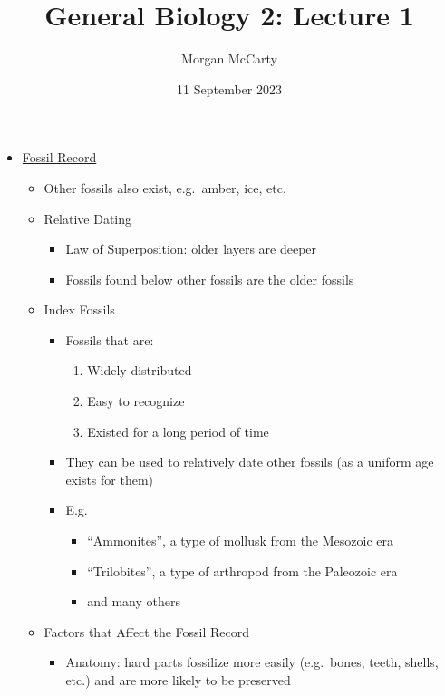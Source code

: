 \documentclass[12pt]{article}
\title{
    General Biology 2: Lecture 1}
\author{Morgan McCarty}
\date{11 September 2023}
\begin{document}
    \maketitle

    \begin{itemize}
        \item \underline{Fossil Record}
        \begin{itemize}
            \item Other fossils also exist, e.g.\ amber, ice, etc.
            \item Relative Dating
            \begin{itemize}
                \item Law of Superposition: older layers are deeper
                \item Fossils found below other fossils are the older fossils
            \end{itemize}
            \item Index Fossils
            \begin{itemize}
                \item Fossils that are:
                \begin{enumerate}
                    \item Widely distributed
                    \item Easy to recognize
                    \item Existed for a long period of time
                \end{enumerate}
                \item They can be used to relatively date other fossils (as a uniform age exists for them)
                \item E.g.
                \begin{itemize}
                    \item ``Ammonites'', a type of mollusk from the Mesozoic era
                    \item ``Trilobites'', a type of arthropod from the Paleozoic era
                    \item and many others
                \end{itemize}
            \end{itemize}
            \item Factors that Affect the Fossil Record
            \begin{itemize}
                \item Anatomy: hard parts fossilize more easily (e.g.\ bones, teeth, shells, etc.) and are more likely to be preserved

\end{itemize}
\end{itemize}
\end{itemize}
\end{document}
